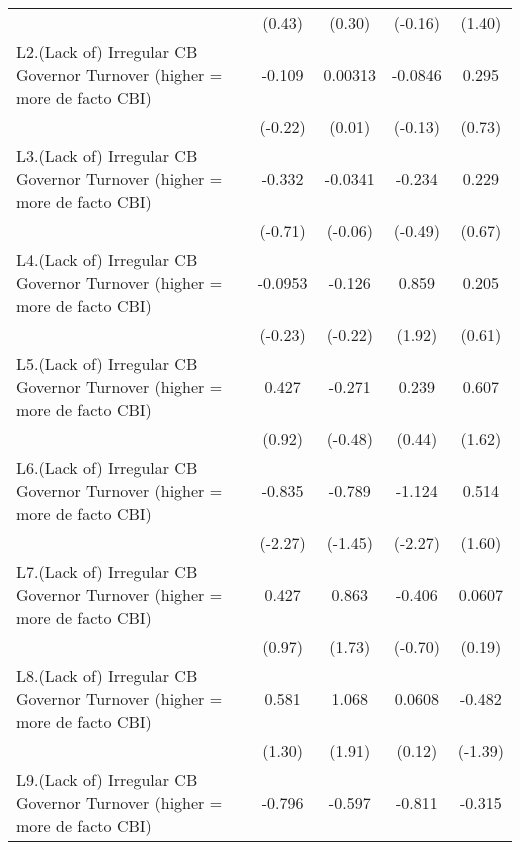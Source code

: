 {\begin{longtable}{l*{4}{c}}
                &   (0.43)         &   (0.30)         &  (-0.16)         &   (1.40)         \\
\addlinespace
L2.(Lack of) Irregular CB Governor Turnover (higher = more de facto CBI)&   -0.109         &  0.00313         &  -0.0846         &    0.295         \\
                &  (-0.22)         &   (0.01)         &  (-0.13)         &   (0.73)         \\
\addlinespace
L3.(Lack of) Irregular CB Governor Turnover (higher = more de facto CBI)&   -0.332         &  -0.0341         &   -0.234         &    0.229         \\
                &  (-0.71)         &  (-0.06)         &  (-0.49)         &   (0.67)         \\
\addlinespace
L4.(Lack of) Irregular CB Governor Turnover (higher = more de facto CBI)&  -0.0953         &   -0.126         &    0.859         &    0.205         \\
                &  (-0.23)         &  (-0.22)         &   (1.92)         &   (0.61)         \\
\addlinespace
L5.(Lack of) Irregular CB Governor Turnover (higher = more de facto CBI)&    0.427         &   -0.271         &    0.239         &    0.607         \\
                &   (0.92)         &  (-0.48)         &   (0.44)         &   (1.62)         \\
\addlinespace
L6.(Lack of) Irregular CB Governor Turnover (higher = more de facto CBI)&   -0.835\sym{*}  &   -0.789         &   -1.124\sym{*}  &    0.514         \\
                &  (-2.27)         &  (-1.45)         &  (-2.27)         &   (1.60)         \\
\addlinespace
L7.(Lack of) Irregular CB Governor Turnover (higher = more de facto CBI)&    0.427         &    0.863         &   -0.406         &   0.0607         \\
                &   (0.97)         &   (1.73)         &  (-0.70)         &   (0.19)         \\
\addlinespace
L8.(Lack of) Irregular CB Governor Turnover (higher = more de facto CBI)&    0.581         &    1.068         &   0.0608         &   -0.482         \\
                &   (1.30)         &   (1.91)         &   (0.12)         &  (-1.39)         \\
\addlinespace
L9.(Lack of) Irregular CB Governor Turnover (higher = more de facto CBI)&   -0.796         &   -0.597         &   -0.811         &   -0.315         \\

\end{longtable}}
